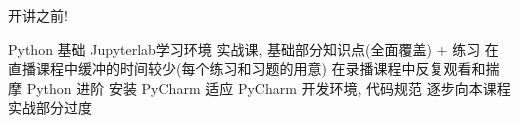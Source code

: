 























\begin{frame}[standout]{开讲之前!}
    \begin{myoutline}
        \1 Python 基础
            \2 Jupyterlab学习环境
            \2 实战课, 基础部分知识点(全面覆盖) + 练习
            \2 在直播课程中缓冲的时间较少(每个练习和习题的用意)
            \2 在录播课程中反复观看和揣摩
        \1 Python 进阶
            \2 安装 PyCharm
            \2 适应 PyCharm 开发环境, 代码规范
            \2 逐步向本课程实战部分过度
    \end{myoutline}
\end{frame}
